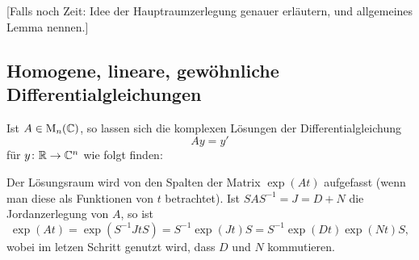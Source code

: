 [Falls noch Zeit: Idee der Hauptraumzerlegung genauer erläutern, und allgemeines Lemma nennen.]










\subsection{Homogene, lineare, gewöhnliche Differentialgleichungen}


Ist $A \in \mathrm{M}_n(\mathbb{C})$, so lassen sich die komplexen Lösungen der Differentialgleichung
\[
  A y = y'
\]
für $y \colon \mathbb{R} \to \mathbb{C}^n$ wie folgt finden:

Der Lösungsraum wird von den Spalten der Matrix $\exp(At)$ aufgefasst (wenn man diese als Funktionen von $t$ betrachtet).
Ist $S A S^{-1} = J = D + N$ die Jordanzerlegung von $A$, so ist
\[
    \exp(At)
  = \exp(S^{-1} Jt S)
  = S^{-1} \exp(Jt) S
  = S^{-1} \exp(Dt) \exp(Nt) S,
\]
wobei im letzen Schritt genutzt wird, dass $D$ und $N$ kommutieren.










